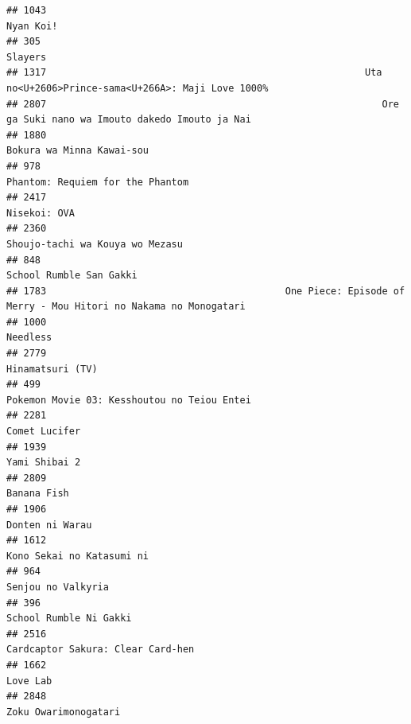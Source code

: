 \documentclass[
]{article}
\begin{document}
\begin{verbatim}
## 1043                                                                                                 Nyan Koi!
## 305                                                                                                    Slayers
## 1317                                                        Uta no<U+2606>Prince-sama<U+266A>: Maji Love 1000%
## 2807                                                           Ore ga Suki nano wa Imouto dakedo Imouto ja Nai
## 1880                                                                                 Bokura wa Minna Kawai-sou
## 978                                                                           Phantom: Requiem for the Phantom
## 2417                                                                                              Nisekoi: OVA
## 2360                                                                           Shoujo-tachi wa Kouya wo Mezasu
## 848                                                                                    School Rumble San Gakki
## 1783                                          One Piece: Episode of Merry - Mou Hitori no Nakama no Monogatari
## 1000                                                                                                  Needless
## 2779                                                                                          Hinamatsuri (TV)
## 499                                                                Pokemon Movie 03: Kesshoutou no Teiou Entei
## 2281                                                                                             Comet Lucifer
## 1939                                                                                             Yami Shibai 2
## 2809                                                                                               Banana Fish
## 1906                                                                                           Donten ni Warau
## 1612                                                                                 Kono Sekai no Katasumi ni
## 964                                                                                         Senjou no Valkyria
## 396                                                                                     School Rumble Ni Gakki
## 2516                                                                         Cardcaptor Sakura: Clear Card-hen
## 1662                                                                                                  Love Lab
## 2848                                                                                      Zoku Owarimonogatari

\end{verbatim}
\end{document}
